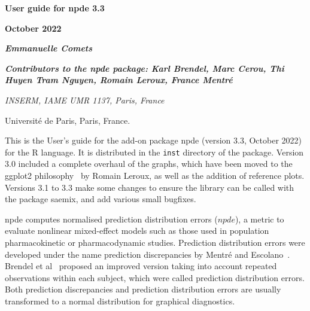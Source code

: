 \documentclass[12pt,a4paper]{article}
\begin{document}

\pagestyle{fancy}
\renewcommand{\headrulewidth}{0pt}
\renewcommand{\footrulewidth}{1pt}
\lhead{}
\chead{}
\rhead{}
\rfoot{\thepage}

\newcommand{\D}{\displaystyle} \normalsize
\renewcommand{\thetable}{\Roman{Contents}}
\renewcommand{\refname}{References}
\renewcommand{\listfigurename}{{\bfseries \sc Legends for figures}}
\renewcommand{\labelitemi}{$\bullet$}

\parindent 18pt
$\phantom{minime}$

\vskip 3cm
\begin{center}
{\setlength{\baselineskip}{2\baselineskip}
{\Large \bfseries User guide for npde 3.3}

{\Large \bfseries October 2022}

\bigskip 

{\Large \itshape \bfseries Emmanuelle Comets}

{\large \itshape \bfseries Contributors to the npde package: Karl Brendel, Marc Cerou, Thi Huyen Tram Nguyen,  Romain Leroux, France Mentr\'e}

\bigskip
{\it
INSERM, IAME UMR 1137, Paris, France

Universit\'e de Paris, Paris, France.
}
\par}
\end{center}

\vskip 8cm %

\newpage
\tableofcontents
\newpage

\hskip 18pt  This is the User's guide for the add-on package {\sf npde} (version 3.3, October 2022) for the {\sf R} 
language. It is distributed in the \texttt{inst} directory of the package. Version 3.0 included a complete overhaul of 
the graphs, which have been moved to the {\sf ggplot2} philosophy~\cite{ggplot2} by Romain Leroux, as well as the 
addition of reference plots. Versions 3.1 to 3.3 make some changes to ensure the library can be called with the 
package {\sf saemix}, and add various small bugfixes.

{\sf npde} computes normalised prediction distribution errors ($npde$), a metric to evaluate nonlinear mixed-effect models such as those used in population pharmacokinetic or pharmacodynamic studies. Prediction distribution errors were developed under the name prediction discrepancies by Mentr\'e and Escolano~\cite{MentrePDE}. Brendel et al~\cite{Brendel06} proposed an improved version taking into account repeated observations within each subject, which were called prediction distribution errors. Both prediction discrepancies and prediction distribution errors are usually transformed to a normal distribution for graphical diagnostics.
\end{document}
